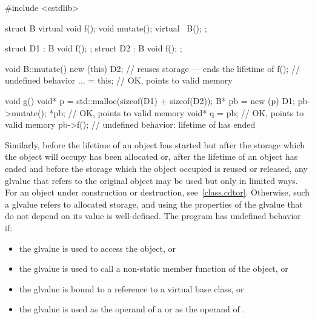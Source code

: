\begin{example}
\begin{codeblock}
#include <cstdlib>

struct B {
  virtual void f();
  void mutate();
  virtual ~B();
};

struct D1 : B { void f(); };
struct D2 : B { void f(); };

void B::mutate() {
  new (this) D2;    // reuses storage --- ends the lifetime of 
  f();              // undefined behavior
  ... = this;       // OK,  points to valid memory
}

void g() {
  void* p = std::malloc(sizeof(D1) + sizeof(D2));
  B* pb = new (p) D1;
  pb->mutate();
  *pb;              // OK,  points to valid memory
  void* q = pb;     // OK,  points to valid memory
  pb->f();          // undefined behavior: lifetime of  has ended
}
\end{codeblock}
\end{example}

\pnum
Similarly, before the lifetime of an object has started but after the
storage which the object will occupy has been allocated or, after the
lifetime of an object has ended and before the storage which the object
occupied is reused or released, any glvalue that refers to the original
object may be used but only in limited ways.
For an object under construction or destruction, see~\ref{class.cdtor}.
Otherwise, such
a glvalue refers to
allocated storage, and using the
properties of the glvalue that do not depend on its value is
well-defined. The program has undefined behavior if:
\begin{itemize}
\item the glvalue is used to access the object, or
\item the glvalue is used to call a non-static member function of the object, or
\item the glvalue is bound to a reference to a virtual base class, or
\item the glvalue is used as the operand of a
 or as the operand of
.
\end{itemize}

